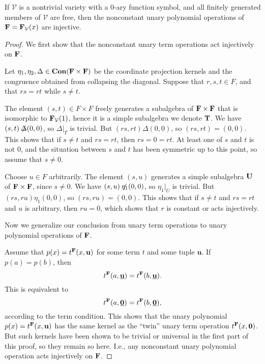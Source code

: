 \begin{lm}\label{injective}
    If $\mathcal V$ is a nontrivial variety with
    a $0$-ary function symbol, and
    all finitely generated members of $\mathcal V$ are free, 
    then the nonconstant unary polynomial operations
    of ${{\mathbf{\uppercase{f}}}}={{\mathbf{\uppercase{f}}}}_{\mathcal V}(x)$ are injective.
\end{lm}

\begin{proof}
  We first show that the nonconstant unary term operations
  act injectively on ${{\mathbf{\uppercase{f}}}}$.
  
  Let $\eta_1, \eta_2, \Delta\in\operatorname{\mathbf{Con}}({{\mathbf{\uppercase{f}}}}\times {{\mathbf{\uppercase{f}}}})$ be
  the coordinate projection kernels and the congruence obtained
  from collapsing the diagonal. Suppose that $r, s, t\in F$,
  and that $rs=rt$ while $s\neq t$.

  The element $(s,t)\in F\times F$ freely generates a subalgebra
  of ${{\mathbf{\uppercase{f}}}}\times {{\mathbf{\uppercase{f}}}}$ that is
  isomorphic to ${{\mathbf{\uppercase{F}}}}_{\mathcal V}(1)$, hence it is
  a simple subalgebra we denote ${{\mathbf{\uppercase{T}}}}$.
  We have $(s,t)\not\!\!\Delta (0,0)$, so $\Delta|_T$ is trivial.
  But $(rs,rt) \Delta (0,0)$, so $(rs,rt)=(0,0)$. This shows that if
  $s\neq t$ and $rs=rt$, then $rs=0=rt$.
  At least one of $s$ and $t$ is not $0$,
  and the situation between $s$ and $t$ has been symmetric up to this point,
  so assume that $s\neq 0$.

  Choose $u\in F$ arbitrarily. The element $(s, u)$ generates a
  simple subalgebra ${{\mathbf{\uppercase{u}}}}$ of ${{\mathbf{\uppercase{f}}}}\times {{\mathbf{\uppercase{f}}}}$, since $s\neq 0$.
  We have $(s,u)\not\!\!\eta_1(0,0)$, so $\eta_1|_U$ is trivial.
  But $(rs,ru) \eta_1 (0,0)$, so $(rs,ru)=(0,0)$. This shows that if
  $s\neq t$ and $rs=rt$ and $u$ is arbitrary, then $ru=0$, which
  shows that $r$ is constant or acts injectively.

  Now we generalize our conclusion from unary
  term operations to unary polynomial operations of ${{\mathbf{\uppercase{f}}}}$.
  
  
Assume that $p(x)=t^{{{\mathbf{\uppercase{f}}}}}(x,{{\mathbf{{u}}}})$
for some term $t$ and some tuple ${{\mathbf{{u}}}}$.
If $p(a)=p(b)$, then
\[
t^{{{\mathbf{\uppercase{f}}}}}(a,\underline{{{\mathbf{{u}}}}}) = t^{{{\mathbf{\uppercase{f}}}}}(b,\underline{{{\mathbf{{u}}}}}).
\]
This is equivalent to 
\[
t^{{{\mathbf{\uppercase{f}}}}}(a,\underline{{{\mathbf{{0}}}}}) = t^{{{\mathbf{\uppercase{f}}}}}(b,\underline{{{\mathbf{{0}}}}}),
\]
according to the term condition.
This shows that the unary polynomial $p(x) = t^{{{\mathbf{\uppercase{f}}}}}(x,{{\mathbf{{u}}}})$
has the same kernel as the ``twin'' unary term operation
$t^{{{\mathbf{\uppercase{f}}}}}(x,{{\mathbf{{0}}}})$. But such kernels have been shown to
be trivial or universal in the first part of this proof,
so they remain so here. I.e., any nonconstant unary
polynomial operation acts injectively on ${{\mathbf{\uppercase{f}}}}$.
  \end{proof}

